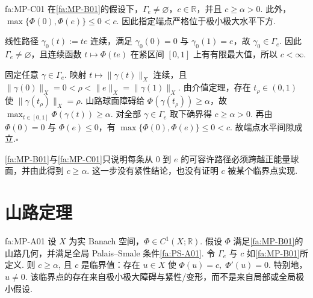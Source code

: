 \begin{FAProposition}[C][山路极小极大基本估计]{fa:MP-C01}
在\autoref{fa:MP-B01}的假设下，\(\displaystyle\Gamma_e\neq\varnothing\)，\(\displaystyle c\in\mathbb R\)，并且
\(\displaystyle c\geqslant\alpha>0\).
此外，
\(\displaystyle \max\{\Phi(0),\Phi(e)\} \leqslant0 < c\).
因此指定端点严格位于极小极大水平下方.
\end{FAProposition}

\begin{FAProof}
线性路径 \(\displaystyle\gamma_0(t):=te\) 连续，满足 \(\displaystyle\gamma_0(0)=0\) 与 \(\displaystyle\gamma_0(1)=e\)，故 \(\displaystyle\gamma_0\in\Gamma_e\). 因此 \(\displaystyle\Gamma_e\neq\varnothing\)，且连续函数 \(\displaystyle t\mapsto\Phi(te)\) 在紧区间 \(\displaystyle[0,1]\) 上有有限最大值，所以 \(\displaystyle c<\infty\).

固定任意 \(\displaystyle\gamma\in\Gamma_e\). 映射 \(\displaystyle t\mapsto\|\gamma(t)\|_X\) 连续，且
\(\displaystyle \|\gamma(0)\|_X=0<\rho<\|e\|_X=\|\gamma(1)\|_X\).
由介值定理，存在 \(\displaystyle t_\rho\in(0,1)\) 使 \(\displaystyle\|\gamma(t_\rho)\|_X=\rho\). 山路球面障碍给 \(\displaystyle\Phi(\gamma(t_\rho))\geqslant\alpha\)，故
\(\displaystyle \max_{t\in[0,1]}\Phi(\gamma(t)) \geqslant \alpha\).
对全部 \(\displaystyle\gamma\in\Gamma_e\) 取下确界得 \(\displaystyle c\geqslant\alpha>0\). 再由 \(\displaystyle\Phi(0)=0\) 与 \(\displaystyle\Phi(e)\leqslant0\)，有
\(\displaystyle \max\{\Phi(0),\Phi(e)\} \leqslant0 < c\).
故端点水平间隙成立.\hfill\(\square\)
\end{FAProof}

\begin{FARemark}[几何只建立障碍]
\autoref{fa:MP-B01}与\autoref{fa:MP-C01}只说明每条从 \(\displaystyle0\) 到 \(\displaystyle e\) 的可容许路径必须跨越正能量球面，并由此得到 \(\displaystyle c\geqslant\alpha\). 这一步没有紧性结论，也没有证明 \(\displaystyle c\) 被某个临界点实现.
\end{FARemark}

\section{山路定理}\label{sec:iii10-mountain-pass-theorem}

\begin{FATheorem}[A][山路定理]{fa:MP-A01}
设 \(\displaystyle X\) 为实 Banach 空间，\(\displaystyle\Phi\in C^1(X;\mathbb R)\). 假设 \(\displaystyle\Phi\) 满足\autoref{fa:MP-B01}的山路几何，并满足全局 Palais--Smale 条件\autoref{fa:PS-A01}. 令 \(\displaystyle\Gamma_e\) 与 \(\displaystyle c\) 如\autoref{fa:MP-B01}所定义. 则
\(\displaystyle c\geqslant\alpha\),
且 \(\displaystyle c\) 是临界值：存在 \(\displaystyle u\in X\) 使
\(\displaystyle \Phi(u)=c, \; \Phi'(u)=0\).
特别地，\(\displaystyle u\neq0\). 该临界点的存在来自极小极大障碍与紧性/变形，而不是来自局部或全局极小假设.
\end{FATheorem}

